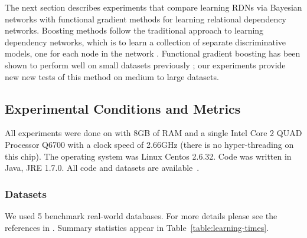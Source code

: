 \documentclass[runningheads,a4paper]{llncs}
\begin{document}
The next section describes experiments that compare learning RDNs via Bayesian networks with functional gradient methods for learning relational dependency networks. Boosting methods follow the traditional approach to learning dependency networks, which is to learn a collection of separate discriminative models, one for each node in the network \cite{Heckerman2000}. Functional gradient boosting has been shown to perform well on small datasets previously \cite{Khot2011,Natarajan2012}; our experiments provide new new tests of this method on medium to large datasets. 

\subsection{Experimental Conditions and Metrics}\label{sec:conditions}

All experiments were done on with 8GB of RAM and a single Intel Core 2 QUAD Processor Q6700 with a clock speed of 2.66GHz (there is no hyper-threading on this chip). The operating system was Linux Centos 2.6.32. Code was written in Java, JRE 1.7.0. All code and datasets are available~\cite{bib:jbnsite}. 

\subsubsection{Datasets}
We used 
5 benchmark real-world databases. For more details please see the references in \cite{Schulte2012}. Summary statistics appear in Table~\ref{table:learning-times}.
\end{document}
